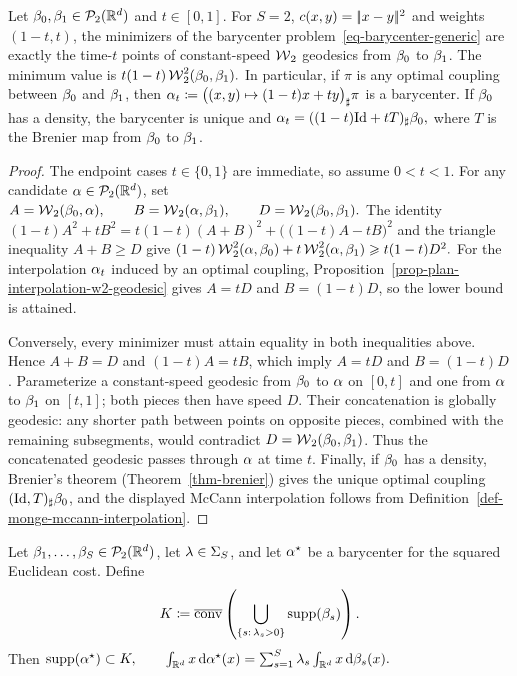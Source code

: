 \begin{prop}\label{prop-two-measure-barycenter-geodesic}
Let $\beta_0,\beta_1\in\mathcal{P}_2(\mathbb{R}^d)$ and $t\in[0,1]$. For $S=2$, $c(x,y)=|\!| x-y |\!|^2$ and weights $(1-t,t)$, the minimizers of the barycenter problem~\eqref{eq-barycenter-generic} are exactly the time-$t$ points of constant-speed $\operatorname{\mathcal{W}}_2$ geodesics from $\beta_0$ to $\beta_1$. The minimum value is
\(t(1-t)\operatorname{\mathcal{W}}_2^2(\beta_0,\beta_1).\)
In particular, if $\pi$ is any optimal coupling between $\beta_0$ and $\beta_1$, then
\(\alpha_t \coloneqq \bigl((x,y)\mapsto(1-t)x+ty\bigr)_\sharp\pi\)
is a barycenter. If $\beta_0$ has a density, the barycenter is unique and
\(\alpha_t=((1-t)\mathrm{Id}+tT)_\sharp\beta_0,\)
where $T$ is the Brenier map from $\beta_0$ to $\beta_1$.
\end{prop}
\begin{proof}
The endpoint cases $t\in\{0,1\}$ are immediate, so assume $0<t<1$. For any candidate $\alpha\in\mathcal{P}_2(\mathbb{R}^d)$, set
\(A=\operatorname{\mathcal{W}}_2(\beta_0,\alpha), \qquad B=\operatorname{\mathcal{W}}_2(\alpha,\beta_1), \qquad D=\operatorname{\mathcal{W}}_2(\beta_0,\beta_1).\)
The identity
\((1-t)A^2+tB^2 = t(1-t)(A+B)^2+\bigl((1-t)A-tB\bigr)^2\)
and the triangle inequality $A+B\geq D$ give
\((1-t)\operatorname{\mathcal{W}}_2^2(\alpha,\beta_0) +t\operatorname{\mathcal{W}}_2^2(\alpha,\beta_1) \geqslant t(1-t)D^2.\)
For the interpolation $\alpha_t$ induced by an optimal coupling, Proposition~\ref{prop-plan-interpolation-w2-geodesic} gives $A=tD$ and $B=(1-t)D$, so the lower bound is attained.

Conversely, every minimizer must attain equality in both inequalities above. Hence $A+B=D$ and $(1-t)A=tB$, which imply $A=tD$ and $B=(1-t)D$. Parameterize a constant-speed geodesic from $\beta_0$ to $\alpha$ on $[0,t]$ and one from $\alpha$ to $\beta_1$ on $[t,1]$; both pieces then have speed $D$. Their concatenation is globally geodesic: any shorter path between points on opposite pieces, combined with the remaining subsegments, would contradict $D=\operatorname{\mathcal{W}}_2(\beta_0,\beta_1)$. Thus the concatenated geodesic passes through $\alpha$ at time $t$. Finally, if $\beta_0$ has a density, Brenier's theorem (Theorem~\ref{thm-brenier}) gives the unique optimal coupling $(\mathrm{Id},T)_\sharp\beta_0$, and the displayed McCann interpolation follows from Definition~\ref{def-monge-mccann-interpolation}.
\end{proof}
\begin{prop}\label{prop-w2-barycenter-mean-support}
Let $\beta_1,\ldots,\beta_S\in\mathcal{P}_2(\mathbb{R}^d)$, let $\lambda\in\Sigma_S$, and let $\alpha^\star$ be a barycenter for the squared Euclidean cost. Define
\[
K
\coloneqq
\overline{\operatorname{conv}}
\left(
\bigcup_{\{s:\,\lambda_s>0\}}\operatorname{supp}(\beta_s)
\right).
\]
Then
\(\operatorname{supp}(\alpha^\star)\subset K, \qquad \int_{\mathbb{R}^d}x\,\mathrm{d}\alpha^\star(x) = \sum_{s=1}^S\lambda_s\int_{\mathbb{R}^d}x\,\mathrm{d}\beta_s(x).\)
\end{prop}
